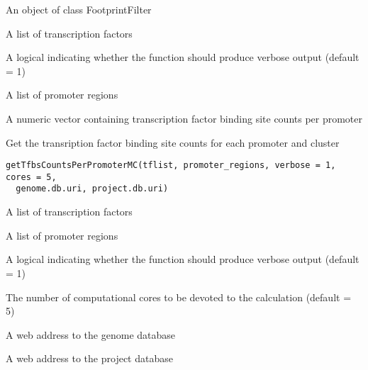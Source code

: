 \documentclass[a4paper]{book}
\begin{document}
%
\begin{Arguments}
\begin{ldescription}
\item[\code{obj}] An object of class FootprintFilter

\item[\code{tflist}] A list of transcription factors

\item[\code{verbose}] A logical indicating whether the function should produce verbose output (default = 1)

\item[\code{promotor\_regions}] A list of promoter regions
\end{ldescription}
\end{Arguments}
%
\begin{Value}
A numeric vector containing transcription factor binding site counts per promoter
\end{Value}
%
\begin{Description}\relax
Get the transription factor binding site counts for each promoter and cluster
\end{Description}
%
\begin{Usage}
\begin{verbatim}
getTfbsCountsPerPromoterMC(tflist, promoter_regions, verbose = 1, cores = 5,
  genome.db.uri, project.db.uri)
\end{verbatim}
\end{Usage}
%
\begin{Arguments}
\begin{ldescription}
\item[\code{tflist}] A list of transcription factors

\item[\code{promoter\_regions}] A list of promoter regions

\item[\code{verbose}] A logical indicating whether the function should produce verbose output (default = 1)

\item[\code{cores}] The number of computational cores to be devoted to the calculation (default = 5)

\item[\code{genome.db.uri}] A web address to the genome database

\item[\code{project.db.uri}] A web address to the project database
\end{ldescription}
\end{Arguments}
\end{document}
